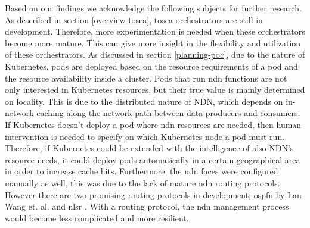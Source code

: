 


Based on our findings we acknowledge the following subjects for further research. As described in section \ref{overview-tosca}, \gls{tosca} orchestrators are still in development. Therefore, more experimentation is needed when these orchestrators become more mature. This can give more insight in the flexibility and utilization of these orchestrators. As discussed in section \ref{planning-poc}, due to the nature of Kubernetes, pods are deployed based on the resource requirements of a pod and the resource availability inside a cluster. Pods that run \gls{ndn} functions are not only interested in Kubernetes resources, but their true value is mainly determined on locality. This is due to the distributed nature of NDN, which depends on in-network caching along the network path between data producers and consumers. If Kubernetes doesn't deploy a pod where \gls{ndn} resources are needed, then human intervention is needed to specify on which Kubernetes node a pod must run. Therefore, if Kubernetes could be extended with the intelligence of also NDN's resource needs, it could deploy pods automatically in a certain geographical area in order to increase cache hits. Furthermore, the \gls{ndn} faces were configured manually as well, this was due to the lack of mature \gls{ndn} routing protocols. However there are two promising routing protocols in development; \gls{ospfn} by Lan Wang et. al. \cite{ndn-ospfn1, ndn-ospfn2} and \gls{nlsr} \cite{nlsr}. With a routing protocol, the \gls{ndn} management process would become less complicated and more resilient.

